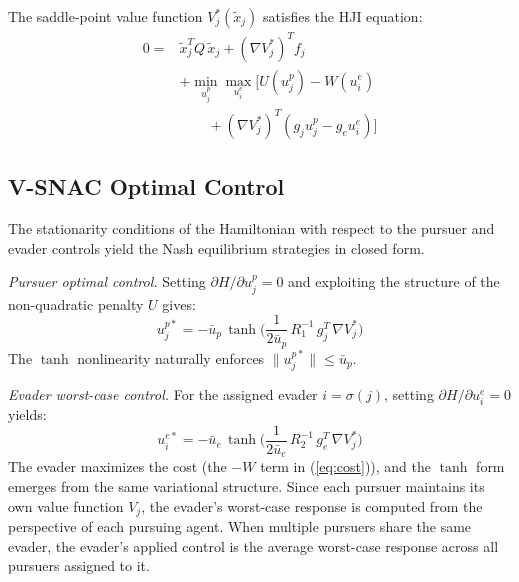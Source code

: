 \documentclass[conference]{IEEEtran}
\begin{document}
The saddle-point value function $V_j^*(\tilde{x}_j)$ satisfies the HJI equation:
\begin{equation}\label{eq:hji}
\begin{split}
0 ={} & \tilde{x}_j^T Q\,\tilde{x}_j + (\nabla V_j^*)^T f_j \\
& + \min_{u_j^p}\max_{u_i^e} \Big[U(u_j^p) - W(u_i^e) \\
& \qquad + (\nabla V_j^*)^T (g_j u_j^p - g_e u_i^e)\Big]
\end{split}
\end{equation}

\subsection{V-SNAC Optimal Control}

The stationarity conditions of the Hamiltonian with respect to the pursuer and evader controls yield the Nash equilibrium strategies in closed form.

\textit{Pursuer optimal control.} Setting $\partial H/\partial u_j^p = 0$ and exploiting the structure of the non-quadratic penalty $U$ gives:
\begin{equation}\label{eq:ctrl_pursuer}
u_j^{p*} = -\bar{u}_p\,\tanh\!\bigg(\frac{1}{2\bar{u}_p}\,R_1^{-1}\,g_j^T\,\nabla V_j^*\bigg)
\end{equation}
The $\tanh$ nonlinearity naturally enforces $\|u_j^{p*}\| \leq \bar{u}_p$.

\textit{Evader worst-case control.} For the assigned evader $i = \sigma(j)$, setting $\partial H/\partial u_i^e = 0$ yields:
\begin{equation}\label{eq:ctrl_evader}
u_i^{e*} = -\bar{u}_e\,\tanh\!\bigg(\frac{1}{2\bar{u}_e}\,R_2^{-1}\,g_e^T\,\nabla V_j^*\bigg)
\end{equation}
The evader maximizes the cost (the $-W$ term in (\ref{eq:cost})), and the $\tanh$ form emerges from the same variational structure. Since each pursuer maintains its own value function $V_j$, the evader's worst-case response is computed from the perspective of each pursuing agent. When multiple pursuers share the same evader, the evader's applied control is the average worst-case response across all pursuers assigned to it.
\end{document}
